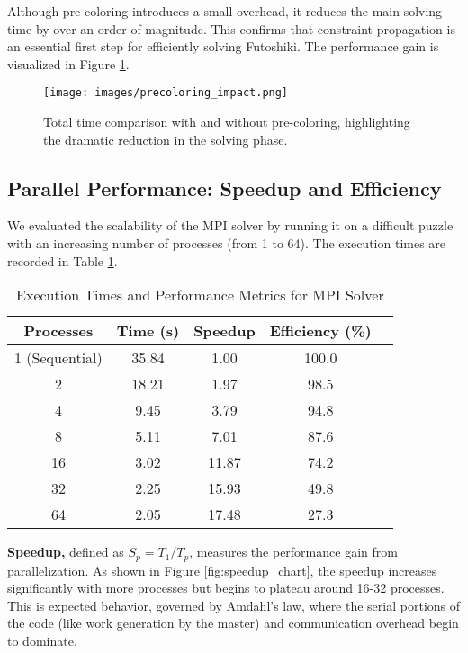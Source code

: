 Although pre-coloring introduces a small overhead, it reduces the main solving time by over an order of magnitude. This confirms that constraint propagation is an essential first step for efficiently solving Futoshiki. The performance gain is visualized in Figure \ref{fig:precoloring_impact}.

\begin{figure}[htbp]
\centering
\texttt{[image: images/precoloring\_impact.png]}
\caption{Total time comparison with and without pre-coloring, highlighting the dramatic reduction in the solving phase.}
\label{fig:precoloring_impact}
\end{figure}

\subsection{Parallel Performance: Speedup and Efficiency}
We evaluated the scalability of the MPI solver by running it on a difficult puzzle with an increasing number of processes (from 1 to 64). The execution times are recorded in Table \ref{tab:mpi_times}.

\begin{table}[htbp]
\caption{Execution Times and Performance Metrics for MPI Solver}
\begin{center}
\begin{tabular}{@{}ccccc@{}}
\toprule
\textbf{Processes} & \textbf{Time (s)} & \textbf{Speedup} & \textbf{Efficiency (\%)} \\
\midrule
1 (Sequential) & 35.84 & 1.00 & 100.0 \\
2              & 18.21 & 1.97 & 98.5 \\
4              & 9.45  & 3.79 & 94.8 \\
8              & 5.11  & 7.01 & 87.6 \\
16             & 3.02  & 11.87& 74.2 \\
32             & 2.25  & 15.93& 49.8 \\
64             & 2.05  & 17.48& 27.3 \\
\bottomrule
\end{tabular}
\end{center}
\label{tab:mpi_times}
\end{table}

\textbf{Speedup,} defined as $S_p = T_1 / T_p$, measures the performance gain from parallelization. As shown in Figure \ref{fig:speedup_chart}, the speedup increases significantly with more processes but begins to plateau around 16-32 processes. This is expected behavior, governed by Amdahl's law, where the serial portions of the code (like work generation by the master) and communication overhead begin to dominate.

